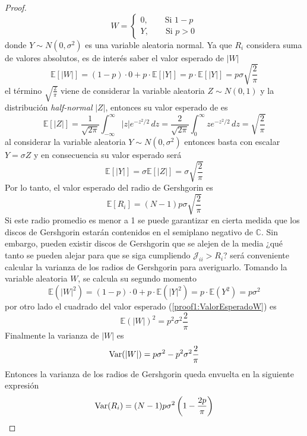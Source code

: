 \begin{proposición}
\begin{proof}
\begin{equation}
			W = 
			\begin{cases}
				0,\qquad \text{Si }1-p\\
				Y,\qquad \text{Si }p>0	
			\end{cases}
		\end{equation}
		donde $Y\sim N(0,\sigma^2)$ es una variable aleatoria normal. Ya que $R_i$ considera suma de valores absolutos, es de interés saber el valor esperado de $|W|$ 
		\begin{equation}\label{proof1:ValorEsperadoW}
			\mathbb{E}[|W|]=(1-p)\cdot 0 + p\cdot \mathbb{E}[|Y|] = p\cdot\mathbb{E}[|Y|] = p\sigma\sqrt{\frac{2}{\pi}}
		\end{equation}
		el término $\sqrt{\frac{2}{\pi}}$ viene de considerar la variable aleatoria $Z\sim N(0,1)$ y la distribución \textit{half-normal} $|Z|$, entonces su valor esperado de es $$\mathbb{E}[|Z|]=\frac{1}{\sqrt{2\pi}}\int_{-\infty}^{\infty}|z|e^{-z^2/2}\, dz=\frac{2}{\sqrt{2\pi}}\int_0^\infty ze^{-z^2/2}\, dz=\sqrt{\frac{2}{\pi}}$$
		al considerar la variable aleatoria $Y\sim N(0,\sigma^2)$ entonces basta con escalar $Y=\sigma Z$ y en consecuencia su valor esperado será $$\mathbb{E}[|Y|]=\sigma \mathbb{E}[|Z|]=\sigma\sqrt{\frac{2}{\pi}}$$
		Por lo tanto, el valor esperado del radio de Gershgorin es
		$$\mathbb{E}[R_i]=(N-1)p\sigma\sqrt{\frac{2}{\pi}}$$
		Si este radio promedio es menor a 1 se puede garantizar en cierta medida que los discos de Gershgorin estarán contenidos en el semiplano negativo de $\mathbb{C}$. Sin embargo, pueden existir discos de Gershgorin que se alejen de la media ¿qué tanto se pueden alejar para que se siga cumpliendo $\mathcal{J}_{ii}>R_i$? será conveniente calcular la varianza de los radios de Gershgorin para averiguarlo. Tomando la variable aleatoria $W$, se calcula su segundo momento
		$$\mathbb{E}(|W|^2)=(1-p)\cdot 0+p\cdot\mathbb{E}(|Y|^2)=p\cdot\mathbb{E}(Y^2)=p\sigma^2$$
		por otro lado el cuadrado del valor esperado (\ref{proof1:ValorEsperadoW}) es
		$$\mathbb{E}(|W|)^2=p^2\sigma^2\frac{2}{\pi}$$
		Finalmente la varianza de $|W|$ es
		$$\mathrm{Var}(|W|)=p\sigma^2-p^2\sigma^2\frac{2}{\pi}$$
		Entonces la varianza de los radios de Gershgorin queda envuelta en la siguiente expresión
		$$\mathrm{Var}(R_i)=(N-1)p\sigma^2\left (1-\frac{2p}{\pi}\right )$$

\end{proof}
\end{proposición}

